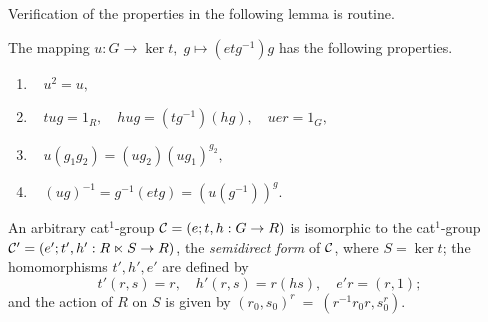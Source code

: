 \medskip
Verification of the properties in the following lemma is routine. 

\begin{lem} \label{lem:u-props}
The mapping $u : G \to \ker t,\; g \mapsto (etg^{-1})g$ has the
following properties.
\begin{enumerate}[{\rm (i)}]
\item~ $u^2 = u,$
\item~ $tug = 1_R,\quad hug = (tg^{-1})(hg),\quad uer = 1_G, $
\item~ $u(g_1g_2) = (ug_2)(ug_1)^{g_2},$
\item~ $(ug)^{-1} = g^{-1}(etg) = (u(g^{-1}))^g.$
\end{enumerate}
\end{lem}

\begin{prop} 
An arbitrary cat$^1$-group  $\mathcal{C} = (e;t,h : G \to R)$
is isomorphic to the cat$^1$-group
$\mathcal{C}' = (e';t',h' : R \ltimes S \to R)$, 
the \emph{semidirect form} of $\mathcal{C}$,   
where  $S = \ker t$;  
the homomorphisms $t',h',e'$  are defined by
\begin{equation} \label{eq:sdpcat1}
t'(r,s) = r, \quad h'(r,s) = r(hs), \quad e'r = (r,1); 
\end{equation}
and the action of $R$ on $S$ is given by $(r_0,s_0)^r ~=~ (r^{-1}r_0r, s_0^r)$. 
\end{prop} 
